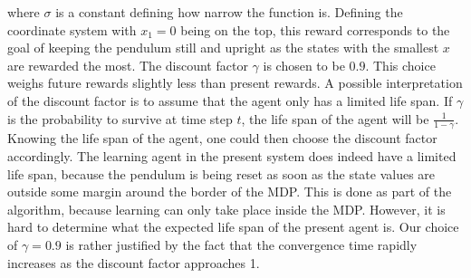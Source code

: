 \documentclass[../main.tex]{subfiles}
\begin{document}
where $\sigma$ is a constant defining how narrow the function is. Defining the coordinate system with $x_1 = 0$ being on the top, this reward corresponds to the goal of keeping the pendulum still and upright as the states with the smallest $x$ are rewarded the most. The discount factor $\gamma$ is chosen to be $0.9$. This choice weighs future rewards slightly less than present rewards. A possible interpretation of the discount factor is to assume that the agent only has a limited life span. If $\gamma$ is the probability to survive at time step $t$, the life span of the agent will be $\frac{1}{1-\gamma}$. Knowing the life span of the agent, one could then choose the discount factor accordingly. The learning agent in the present system does indeed have a limited life span, because the pendulum is being reset as soon as the state values are outside some margin around the border of the MDP. This is done as part of the algorithm, because learning can only take place inside the MDP. However, it is hard to determine what the expected life span of the present agent is. Our choice of $\gamma = 0.9$ is rather justified by the fact that the convergence time rapidly increases as the discount factor approaches 1. 
\end{document}
